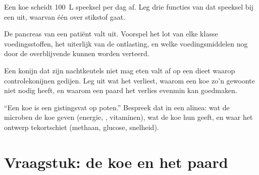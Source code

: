 \begin{exercise}[$\star\star$]\label{exo:b1:digestion-absorption:9}
Een koe scheidt \qty{100}{L} speeksel per dag af. Leg drie functies van dat
speeksel bij een  uit, waarvan één over stikstof gaat.
\end{exercise}

\begin{exercise}[$\star\star\star$]\label{exo:b1:digestion-absorption:10}
De pancreas van een patiënt valt uit. Voorspel het lot van elke klasse
voedingsstoffen, het uiterlijk van de ontlasting, en welke voedingsmiddelen
nog door de overblijvende  kunnen worden verteerd.
\end{exercise}

\begin{exercise}[$\star\star\star$]\label{exo:b1:digestion-absorption:11}
Een konijn dat zijn nachtkeutels niet mag eten valt af op een dieet waarop
controlekonijnen gedijen. Leg uit wat het verliest, waarom een koe zo'n
gewoonte niet nodig heeft, en waarom een paard het verlies evenmin kan
goedmaken.
\end{exercise}

\begin{exercise}[$\star\star\star$]\label{exo:b1:digestion-absorption:12}
``Een koe is een gistingsvat op poten.'' Bespreek dat in een alinea: wat de
microben de koe geven (energie, , vitaminen), wat de koe hun geeft, en
waar het ontwerp tekortschiet (methaan, glucose, snelheid).
\end{exercise}

\section{Vraagstuk: de koe en het paard}

